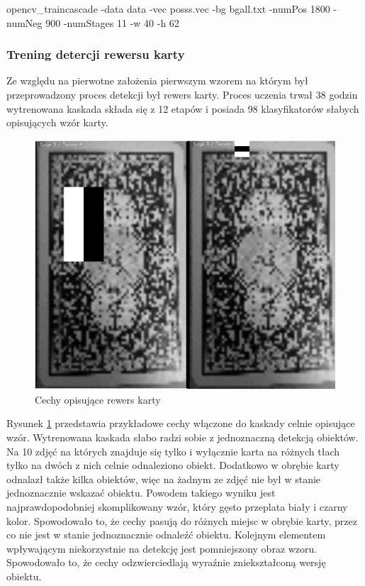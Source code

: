 opencv\_traincascade -data data -vec posss.vec -bg bgall.txt -numPos 1800 -numNeg 900 -numStages 11 -w 40 -h 62

\subsubsection{Trening detercji rewersu karty}

Ze względu na pierwotne założenia pierwszym wzorem na którym był przeprowadzony proces detekcji był rewers karty. Proces uczenia trwał 38 godzin wytrenowana kaskada składa się z 12 etapów i posiada 98 klasyfikatorów słabych opisujących wzór karty.

\begin{figure}[H]
\centering
\includegraphics[scale=0.2]{imgs/cechyRewers.png}
\caption{Cechy opisujące rewers karty}
\label{fig:cechyRewers}
\end{figure}

Rysunek \ref{fig:cechyRewers} przedstawia przykładowe cechy włączone do kaskady celnie opisujące wzór. Wytrenowana kaskada słabo radzi sobie z jednoznaczną detekcją obiektów. Na 10 zdjęć na których znajduje się tylko i wyłącznie karta na różnych tłach tylko na dwóch z nich celnie odnaleziono obiekt. Dodatkowo w obrębie karty odnalazł także kilka obiektów, więc na żadnym ze zdjęć nie był w stanie jednoznacznie wskazać obiektu. Powodem takiego wyniku jest najprawdopodobniej skomplikowany wzór, który gęsto przeplata biały i czarny kolor. Spowodowało to, że cechy pasują do różnych miejsc w obrębie karty, przez co nie jest w stanie jednoznacznie odnaleźć obiektu. Kolejnym elementem wpływającym niekorzystnie na detekcję jest pomniejszony obraz wzoru. Spowodowało to, że cechy odzwierciedlają wyraźnie zniekształconą wersję obiektu.

